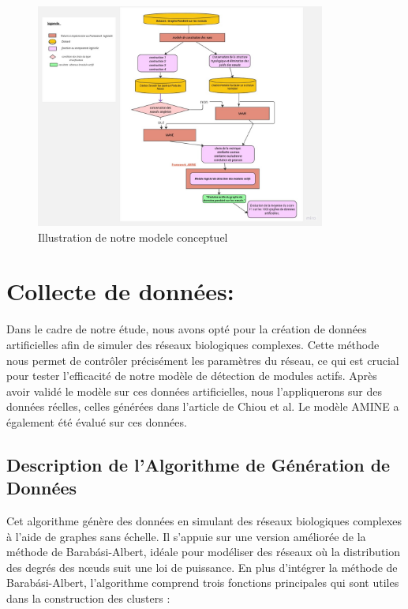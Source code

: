 \begin{figure}[h]
\centering
\includegraphics[width=0.85\textwidth]{Pictures/modele_conceptuel.jpg}
\captionsetup{justification=centering}
\caption{Illustration de notre modele conceptuel}
\label{fig:Modele_conceptuel}
\end{figure}


\section{ Collecte de données:}

Dans le cadre de notre étude, nous avons opté pour la création de données artificielles afin de simuler des réseaux biologiques complexes. Cette méthode nous permet de contrôler précisément les paramètres du réseau, ce qui est crucial pour tester l'efficacité de notre modèle de détection de modules actifs. Après avoir validé le modèle sur ces données artificielles, nous l'appliquerons sur des données réelles, celles générées dans l'article de Chiou et al. Le modèle AMINE a également été évalué sur ces données.


\subsection{Description de l'Algorithme de Génération de Données } 

Cet algorithme génère des données en simulant des réseaux biologiques complexes à l'aide de graphes sans échelle. Il s'appuie sur une version améliorée de la méthode de Barabási-Albert, idéale pour modéliser des réseaux où la distribution des degrés des nœuds suit une loi de puissance. En plus d'intégrer la méthode de Barabási-Albert, l'algorithme comprend trois fonctions principales qui sont  utiles dans la construction des clusters  :

